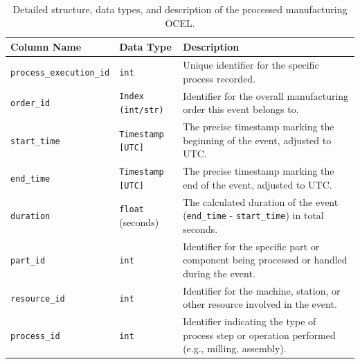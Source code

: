 \begin{table}[htbp]
    \centering
    \caption{Detailed structure, data types, and description of the processed manufacturing OCEL.}
    \label{tab:output-structure-detailed}
    \begin{tabular}{l l p{6cm}} %
        \toprule
        \textbf{Column Name}            & \textbf{Data Type}       & \textbf{Description}                                                                                                                              \\
        \midrule
        \texttt{process\_execution\_id} & \texttt{int}             & Unique identifier for the specific process recorded.                                                                                              \\
        \texttt{order\_id}              & \texttt{Index (int/str)} & Identifier for the overall manufacturing order this event belongs to.                                                                             \\
        \texttt{start\_time}            & \texttt{Timestamp [UTC]} & The precise timestamp marking the beginning of the event, adjusted to UTC.                                                                        \\
        \texttt{end\_time}              & \texttt{Timestamp [UTC]} & The precise timestamp marking the end of the event, adjusted to UTC.                                                                              \\
        \texttt{duration}               & \texttt{float} (seconds) & The calculated duration of the event (\texttt{end\_time} - \texttt{start\_time}) in total seconds.                                                \\
        \texttt{part\_id}               & \texttt{int}             & Identifier for the specific part or component being processed or handled during the event.                                                        \\
        \texttt{resource\_id}           & \texttt{int}             & Identifier for the machine, station, or other resource involved in the event.                                                                     \\
        \texttt{process\_id}            & \texttt{int}             & Identifier indicating the type of process step or operation performed (e.g., milling, assembly).                                                  \\

\end{tabular}
\end{table}
